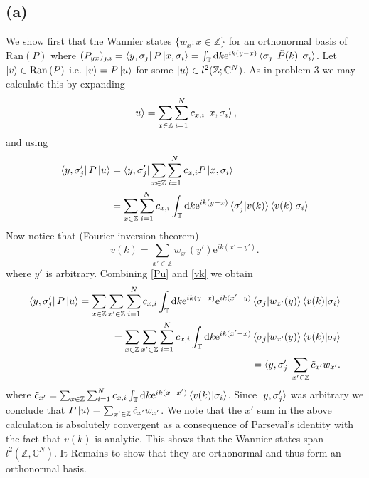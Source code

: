 \documentclass[a4paper,11pt]{article}
\newcommand{\euler}[1]{\text{e}^{#1}}
\newcommand{\Ran}[1]{\text{Ran}\left(#1\right)}
\newcommand*\diff{\mathop{}\!\mathrm{d}}
\newcommand{\C}{\mathbb{C}}
\newcommand{\Z}{\mathbb{Z}}
\numberwithin{equation}{section}
\begin{document}
 	 \subsection*{(a)} We show first that the Wannier states $ \{w_x : x\in\Z \}$ for an orthonormal basis of $ \Ran{P} $ where $ (P_{yx})_{j,i}=\bra{y,\sigma_j}P\ket{x,\sigma_i}=\int_\mathbb{T} \diff k \euler{ik(y-x)}\bra{\sigma_j}\tilde{P}(k)\ket{\sigma_i}$. Let $ \ket{v}\in\Ran{P} $ i.e. $ \ket{v}=P\ket{u} $ for some $ \ket{u}\in l^2(\Z;\C^N) $. As in problem 3 we may calculate this by expanding\begin{equation}
 	 \ket{u}=\sum_{x\in\Z}\sum_{i=1}^{N}c_{x,i}\ket{x,\sigma_i},
 	 \end{equation} 
 	 and using\begin{equation}
 	 \begin{aligned}
 	 \bra{y,\sigma_j'}P\ket{u}&=\bra{y,\sigma_j'}\sum_{x\in\Z}\sum_{i=1}^{N}c_{x,i}P\ket{x,\sigma_i}\\&=\sum_{x\in\Z}\sum_{i=1}^{N}c_{x,i}\int_\mathbb{T}\diff k \euler{ik(y-x)}\braket{\sigma_j'|v(k)}\braket{v(k)|\sigma_i}\label{Pu}
 	 \end{aligned}
 	 \end{equation}
 	 Now notice that (Fourier inversion theorem) \begin{equation}
 	 v(k)=\sum_{x'\in\Z}w_{x'}(y')\euler{ik(x'-y')}. \label{vk}
 	 \end{equation}
 	 where $ y' $ is arbitrary.
 	 Combining \eqref{Pu} and \eqref{vk} we obtain\begin{equation}
 	 \begin{aligned}
 	 \bra{y,\sigma_j'}P\ket{u}=\sum_{x\in\Z}\sum_{x'\in\Z}\sum_{i=1}^{N}c_{x,i}\int_\mathbb{T}\diff k \euler{ik(y-x)}\euler{ik(x'-y)}\braket{\sigma_j|w_{x'}(y)}\braket{v(k)|\sigma_i}\\
 	 =\sum_{x\in\Z}\sum_{x'\in\Z}\sum_{i=1}^{N}c_{x,i}\int_\mathbb{T}\diff k \euler{ik(x'-x)}\braket{\sigma_j|w_{x'}(y)}\braket{v(k)|\sigma_i}\\
 	 =\bra{y,\sigma_j'}\sum_{x'\in\Z} \tilde{c}_{x'}w_{x'}.
 	 \end{aligned}
 	 \end{equation}
 	 where $ \tilde{c}_{x'}=\sum_{x\in\Z}\sum_{i=1}^{N}c_{x,i}\int_{\mathbb{T}}\diff k \euler{ik(x-x')}\braket{v(k)|\sigma_i}$. Since $ \ket{y,\sigma_j'} $ was arbitrary we conclude that $ P\ket{u}=\sum_{x'\in\Z} \tilde{c}_{x'}w_{x'} $. We note that the $ x' $ sum in the above calculation is absolutely convergent as a consequence of Parseval's identity with the fact that $ v(k) $ is analytic. This shows that the Wannier states span $ l^2(\Z,\C^N) $. It Remains to show that they are orthonormal and thus form an orthonormal basis.\\
\end{document}
